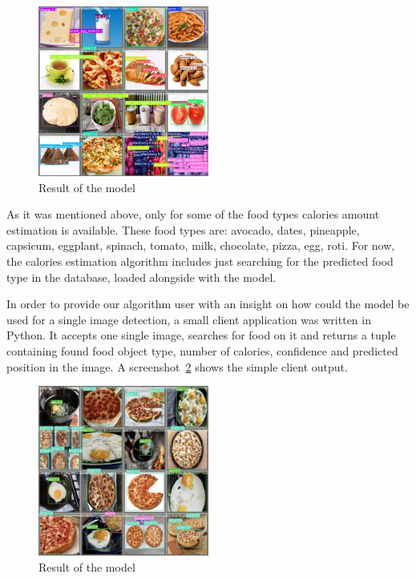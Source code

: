 \documentclass[10pt,twocolumn,letterpaper]{article}
\begin{document}
\begin{figure}[htbp]
    \centering
    \includegraphics[width=0.5\textwidth]{detection-result.png}
    \caption{Result of the model}\label{complete-detection-result}
\end{figure}

As it was mentioned above, only for some of the food types calories amount estimation is available.
These food types are: avocado, dates, pineapple, capsicum, eggplant, spinach, tomato, milk, chocolate, pizza, egg, roti.
For now, the calories estimation algorithm includes just searching for the predicted food type in the database, loaded alongside with the model.

In order to provide our algorithm user with an insight on how could the model be used for a single image detection, a small client application was written in Python.
It accepts one single image, searches for food on it and returns a tuple containing found food object type, number of calories, confidence and predicted position in the image.
A screenshot~\ref{simple-client-result} shows the simple client output.

\begin{figure}[htbp]
    \centering
    \includegraphics[width=0.5\textwidth]{simple-detector.png}
    \caption{Result of the model}\label{simple-client-result}
\end{figure}
\end{document}
